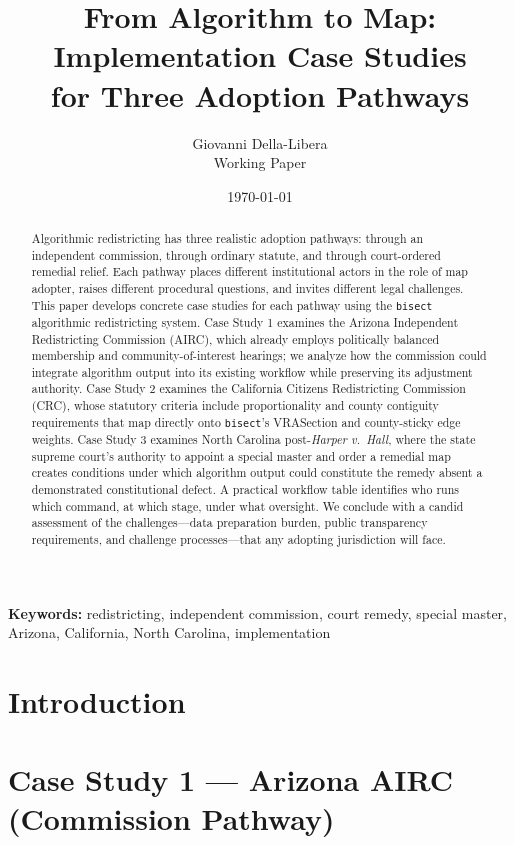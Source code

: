 \documentclass[12pt]{article}
\title{From Algorithm to Map: Implementation Case Studies\\
for Three Adoption Pathways}
\author{Giovanni Della-Libera\\
\small{Working Paper}}
\date{\today}
\begin{document}
\maketitle

\begin{abstract}
Algorithmic redistricting has three realistic adoption pathways: through an
independent commission, through ordinary statute, and through court-ordered
remedial relief.  Each pathway places different institutional actors in the
role of map adopter, raises different procedural questions, and invites
different legal challenges.  This paper develops concrete case studies for
each pathway using the \texttt{bisect} algorithmic redistricting system.
Case Study 1 examines the Arizona Independent Redistricting Commission (AIRC),
which already employs politically balanced membership and community-of-interest
hearings; we analyze how the commission could integrate algorithm output into
its existing workflow while preserving its adjustment authority.  Case Study 2
examines the California Citizens Redistricting Commission (CRC), whose
statutory criteria include proportionality and county contiguity requirements
that map directly onto \texttt{bisect}'s VRASection and county-sticky edge
weights.  Case Study 3 examines North Carolina post-\textit{Harper v.\ Hall},
where the state supreme court's authority to appoint a special master and order
a remedial map creates conditions under which algorithm output could constitute
the remedy absent a demonstrated constitutional defect.  A practical workflow
table identifies who runs which command, at which stage, under what oversight.
We conclude with a candid assessment of the challenges---data preparation
burden, public transparency requirements, and challenge processes---that any
adopting jurisdiction will face.
\end{abstract}

\noindent\textbf{Keywords:} redistricting, independent commission, court
remedy, special master, Arizona, California, North Carolina, implementation

\section{Introduction}


\section{Case Study 1 --- Arizona AIRC (Commission Pathway)}

\end{document}
